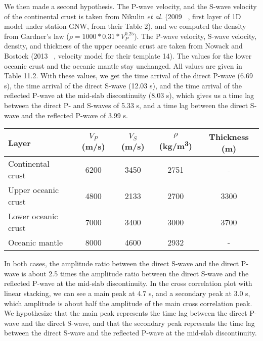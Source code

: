 \documentclass[workdone.tex]{subfiles}
\begin{document}
We then made a second hypothesis. The P-wave velocity, and the S-wave velocity of the continental crust is taken from Nikulin \textit{et al.} (2009 ~\cite{NIK_2009}, first layer of 1D model under station GNW, from their Table 2), and we computed the density from Gardner's law ($\rho = 1000 * 0.31 * V_P^{0.25}$). The P-wave velocity, S-wave velocity, density, and thickness of the upper oceanic crust are taken from Nowack and Bostock (2013 ~\cite{NOW_2013}, velocity model for their template 14). The values for the lower oceanic crust and the oceanic mantle stay unchanged. All values are given in Table 11.2. With these values, we get the time arrival of the direct P-wave (6.69 s), the time arrival of the direct S-wave (12.03 s), and the time arrival of the reflected P-wave at the mid-slab discontinuity (8.03 s), which gives us a time lag between the direct P- and S-waves of 5.33 s, and a time lag between the direct S-wave and the reflected P-wave of 3.99 s. \\

\begin{center}
\begin{tabular}{| l | c | c | c | c |}
  \hline
  Layer & $V_P$ (m/s) & $V_S$ (m/s) & $\rho$ (kg/m\textsuperscript{3}) & Thickness (m) \\
  \hline
  Continental crust & 6200 & 3450 & 2751 & - \\
  Upper oceanic crust & 4800 & 2133 & 2700 & 3300 \\
  Lower oceanic crust & 7000 & 3400 & 3000 & 3700 \\
  Oceanic mantle & 8000 & 4600 & 2932 & - \\
  \hline
\end{tabular}
\captionsetup{type=table}
\end{center}

In both cases, the amplitude ratio between the direct S-wave and the direct P-wave is about 2.5 times the amplitude ratio between the direct S-wave and the reflected P-wave at the mid-slab discontinuity. In the cross correlation plot with linear stacking, we can see a main peak at 4.7 s, and a secondary peak at 3.0 s, which amplitude is about half the amplitude of the main cross correlation peak. We hypothesize that the main peak represents the time lag between the direct P-wave and the direct S-wave, and that the secondary peak represents the time lag between the direct S-wave and the reflected P-wave at the mid-slab discontinuity. \\
\end{document}
